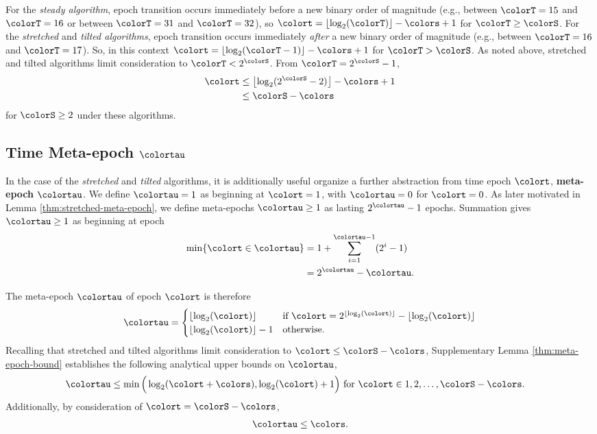 For the \textit{steady algorithm}, epoch transition occurs immediately before a new binary order of magnitude (e.g., between $\colorT = 15$ and $\colorT = 16$ or between $\colorT = 31$ and $\colorT = 32$), so $\colort = \left\lfloor \log_2(\colorT) \right\rfloor - \colors + 1$ for $\colorT \geq \colorS$.
For the \textit{stretched} and \textit{tilted algorithms}, epoch transition occurs immediately \textit{after} a new binary order of magnitude (e.g., between $\colorT = 16$ and $\colorT = 17$).
So, in this context $\colort = \left\lfloor \log_2(\colorT - 1) \right\rfloor - \colors + 1$ for $\colorT > \colorS$.
As noted above, stretched and tilted algorithms limit consideration to $\colorT < 2^{\colorS}$.
From $\colorT = 2^{\colorS} - 1$,
\begin{align*}
\colort &\leq \left\lfloor\log_2(2^{\colorS} - 2)\right\rfloor - \colors + 1 \\
&\leq \colorS - \colors
\end{align*}
for $\colorS \geq 2$ under these algorithms.

\subsection{Time Meta-epoch $\colortau$}
\label{sec:notation-metaepoch}

In the case of the \textit{stretched} and \textit{tilted} algorithms, it is additionally useful organize a further abstraction from time epoch $\colort$, \textbf{meta-epoch} $\colortau$.
We define $\colortau=1$ as beginning at $\colort = 1$, with $\colortau=0$ for $\colort=0$.
As later motivated in Lemma \ref{thm:stretched-meta-epoch}, we define meta-epochs $\colortau\geq1$ as lasting $2^{\colortau} - 1$ epochs.
Summation gives $\colortau\geq1$ as beginning at epoch
\begin{align*}
\min\{\colort \in \colortau\}
&= 1 + \sum_{i=1}^{\colortau - 1} (2^{i} - 1) \\
&= 2^{\colortau} - \colortau.
\end{align*}

The meta-epoch $\colortau$ of epoch $\colort$ is therefore
\begin{align*}
\colortau
=
\begin{cases}
\left\lfloor \log_2(\colort) \right\rfloor & \text{if } \colort = 2^{\left\lfloor \log_2(\colort) \right\rfloor} - \left\lfloor \log_2(\colort) \right\rfloor \\
\left\lfloor \log_2(\colort) \right\rfloor - 1 & \text{otherwise.}
\end{cases}
\end{align*}
Recalling that stretched and tilted algorithms limit consideration to $\colort \leq \colorS - \colors$, Supplementary Lemma \ref{thm:meta-epoch-bound} establishes the following analytical upper bounds on $\colortau$,
\begin{align*}
\colortau
&\leq
\min\Big(
  \log_2(\colort + \colors),
  \log_2(\colort) + 1
\Big)
\text{ for } \colort \in 1, 2, \ldots, \colorS - \colors.
\end{align*}
Additionally, by consideration of $\colort = \colorS - \colors$,
\begin{align*}
\colortau \leq \colors.
\end{align*}

